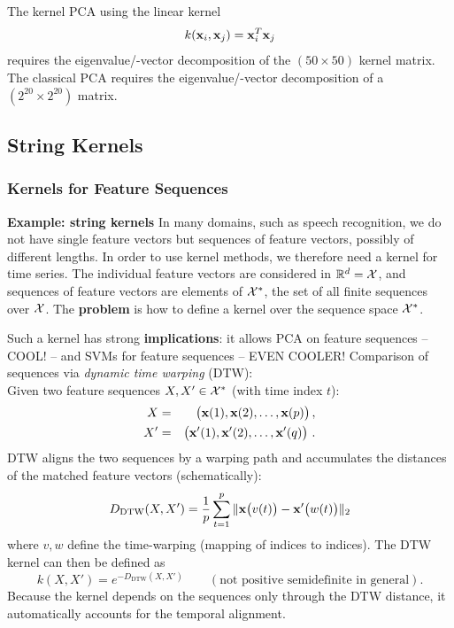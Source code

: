 		The kernel PCA using the linear kernel
		\begin{displaymath}
			k(\bm{\mathrm{x}}_i, \bm{\mathrm{x}}_j) = \bm{\mathrm{x}}_i^T \bm{\mathrm{x}}_j
		\end{displaymath}
		requires the eigenvalue/-vector decomposition of the $(50\times 50)$ kernel matrix. \\
		The classical PCA requires the eigenvalue/-vector decomposition of a $(2^{20} \times 2^{20})$ matrix.

\subsection{String Kernels}
	\subsubsection{Kernels for Feature Sequences}

	 \textbf{Example: string kernels}
		In many domains, such as speech recognition, we do not have single feature vectors but sequences of feature vectors, possibly of different lengths. In order to use kernel methods, we therefore need a kernel for time series. The individual feature vectors are considered in $\mathbb{R}^d =\cal X$, and sequences of feature vectors are elements of $\cal X^*$, the set of all finite sequences over $\cal X$. The \textbf{problem} is how to define a kernel over the sequence space $\cal X^*$.

		Such a kernel has strong \textbf{implications}: it allows PCA on feature sequences -- COOL! -- and SVMs for feature sequences -- EVEN COOLER!
		Comparison of sequences via \emph{dynamic time warping} (DTW): \\

		Given two feature sequences $X, X'\in {\cal X^*}$ (with time index $t$):
		\begin{eqnarray*}
			X   &=& \big( \bm{\mathrm{x}}(1), \bm{\mathrm{x}}(2), \dots, \bm{\mathrm{x}}(p)\big) \, ,\\
			X'  &=& \big( \bm{\mathrm{x}}'(1), \bm{\mathrm{x}}'(2), \dots, \bm{\mathrm{x}}'(q)\big)~.
		\end{eqnarray*}
		DTW aligns the two sequences by a warping path and accumulates the distances of the matched feature vectors (schematically):
			      \begin{displaymath}
				      D_{\text{DTW}}(X,X') = \frac{1}{p}\sum_{t=1}^{p} \| \bm{\mathrm{x}}\big(v(t)\big)- \bm{\mathrm{x}}'\big(w(t)\big) \|_2
			      \end{displaymath}
			      where $v, w$ define the time-warping (mapping of indices to indices). The DTW kernel can then be defined as
			      \begin{displaymath}
				      k(X,X') = e^{-D_{\text{DTW}}(X,X')}\qquad (\text{not positive semidefinite in general}).
			      \end{displaymath}
		Because the kernel depends on the sequences only through the DTW distance, it automatically accounts for the temporal alignment.

